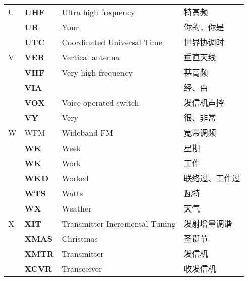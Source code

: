 \begin{longtable}[l]{llll}
  U & \textbf{UHF}                      & Ultra high frequency                    & 特高频                 \\
    & \textbf{UR}                       & Your                                    & 你的，你是               \\
    & \textbf{UTC}                      & Coordinated Universal Time              & 世界协调时               \\%
  V & \textbf{VER}                      & Vertical antenna                        & 垂直天线                \\
    & \textbf{VHF}                      & Very high frequency                     & 甚高频                 \\
    & \textbf{VIA}                      &                                         & 经、由                 \\
    & \textbf{VOX}                      & Voice-operated switch                   & 发信机声控               \\
    & \textbf{VY}                       & Very                                    & 很、非常                \\
  W & WFM                               & Wideband FM                             & 宽带调频                \\
    & \textbf{WK}                       & Week                                    & 星期                  \\
    & \textbf{WK}                       & Work                                    & 工作                  \\
    & \textbf{WKD}                      & Worked                                  & 联络过、工作过             \\
    & \textbf{WTS}                      & Watts                                   & 瓦特                  \\
    & \textbf{WX}                       & Weather                                 & 天气                  \\
  X & \textbf{XIT}                      & Transmitter Incremental Tuning          & 发射增量调谐              \\
    & \textbf{XMAS}                     & Christmas                               & 圣诞节                 \\
    & \textbf{XMTR}                     & Transmitter                             & 发信机                 \\
    & \textbf{XCVR}                     & Transceiver                             & 收发信机                \\

\end{longtable}
